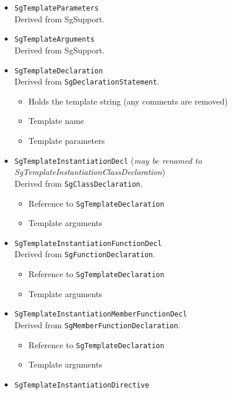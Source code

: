\begin{itemize}
     \item {\tt SgTemplateParameters} \\
           Derived from SgSupport.

     \item {\tt SgTemplateArguments} \\
           Derived from SgSupport.

     \item {\tt SgTemplateDeclaration} \\
           Derived from {\tt SgDeclarationStatement}.
          \begin{itemize}
               \item Holds the template string (any comments are removed)
               \item Template name
               \item Template parameters
          \end{itemize}
     \item {\tt SgTemplateInstantiationDecl} ({\em may be renamed to SgTemplateInstantiationClassDeclaration}) \\
           Derived from {\tt SgClassDeclaration}.
          \begin{itemize}
               \item Reference to {\tt SgTemplateDeclaration}
               \item Template arguments
          \end{itemize}
     \item {\tt SgTemplateInstantiationFunctionDecl} \\
           Derived from {\tt SgFunctionDeclaration}.
          \begin{itemize}
               \item Reference to {\tt SgTemplateDeclaration}
               \item Template arguments
          \end{itemize}
     \item {\tt SgTemplateInstantiationMemberFunctionDecl} \\
           Derived from {\tt SgMemberFunctionDeclaration}.
          \begin{itemize}
               \item Reference to {\tt SgTemplateDeclaration}
               \item Template arguments
          \end{itemize}
     \item {\tt SgTemplateInstantiationDirective} \\

\end{itemize}
